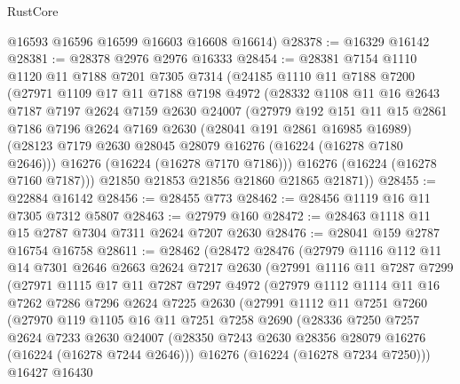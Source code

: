 \begin{lexlean}{RustCore}
\begin{coremodule}
      @16593
      @16596
      @16599
      @16603
      @16608
      @16614)
@28378 := @16329 @16142
@28381 := @28378 @2976 @2976 @16333
@28454 := @28381
    @7154
    @1110
    @1120
    @11
    @7188
    @7201
    @7305
    @7314
    (@24185
      @1110
      @11
      @7188
      @7200
      (@27971
        @1109
        @17
        @11
        @7188
        @7198
        @4972
        (@28332
          @1108
          @11
          @16
          @2643
          @7187
          @7197
          @2624
          @7159
          @2630
          @24007
          (@27979
            @192
            @151
            @11
            @15
            @2861
            @7186
            @7196
            @2624
            @7169
            @2630
            (@28041 @191 @2861 @16985 @16989)
            (@28123 @7179 @2630 @28045 @28079 @16276 (@16224 (@16278 @7180 @2646)))
            @16276
            (@16224 (@16278 @7170 @7186)))
          @16276
          (@16224 (@16278 @7160 @7187)))
        @21850
        @21853
        @21856
        @21860
        @21865
        @21871))
@28455 := @22884 @16142
@28456 := @28455 @773
@28462 := @28456 @1119 @16 @11 @7305 @7312 @5807
@28463 := @27979 @160
@28472 := @28463 @1118 @11 @15 @2787 @7304 @7311 @2624 @7207 @2630
@28476 := @28041 @159 @2787 @16754 @16758
@28611 := @28462
    (@28472
      @28476
      (@27979
        @1116
        @112
        @11
        @14
        @7301
        @2646
        @2663
        @2624
        @7217
        @2630
        (@27991
          @1116
          @11
          @7287
          @7299
          (@27971
            @1115
            @17
            @11
            @7287
            @7297
            @4972
            (@27979
              @1112
              @1114
              @11
              @16
              @7262
              @7286
              @7296
              @2624
              @7225
              @2630
              (@27991
                @1112
                @11
                @7251
                @7260
                (@27970
                  @119
                  @1105
                  @16
                  @11
                  @7251
                  @7258
                  @2690
                  (@28336
                    @7250
                    @7257
                    @2624
                    @7233
                    @2630
                    @24007
                    (@28350 @7243 @2630 @28356 @28079 @16276 (@16224 (@16278 @7244 @2646)))
                    @16276
                    (@16224 (@16278 @7234 @7250)))
                  @16427
                  @16430

\end{coremodule}
\end{lexlean}
